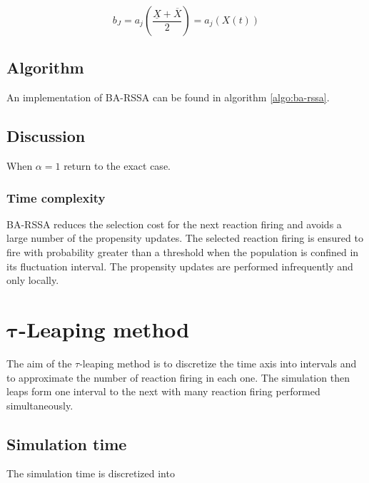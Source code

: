   $$b_J = a_j\left(\frac{\underline{X}+\overline{X}}{2}\right) = a_j(X(t))$$

  \subsection{Algorithm}
  An implementation of BA-RSSA can be found in algorithm \ref{algo:ba-rssa}.

  

  \subsection{Discussion}
  When $\alpha = 1$ return to the exact case.

    \subsubsection{Time complexity}
    BA-RSSA reduces the selection cost for the next reaction firing and avoids a large number of the propensity updates.
    The selected reaction firing is ensured to fire with  probability greater than a threshold when the population is confined in its fluctuation interval.
    The propensity updates are performed infrequently and only locally.


\section{$\mathbf{\tau}$-Leaping method}
The aim of the $\tau$-leaping method is to discretize the time axis into intervals and to approximate the number of reaction firing in each one.
The simulation then leaps form one interval to the next with many reaction firing performed simultaneously.

  \subsection{Simulation time}
  The simulation time is discretized into







